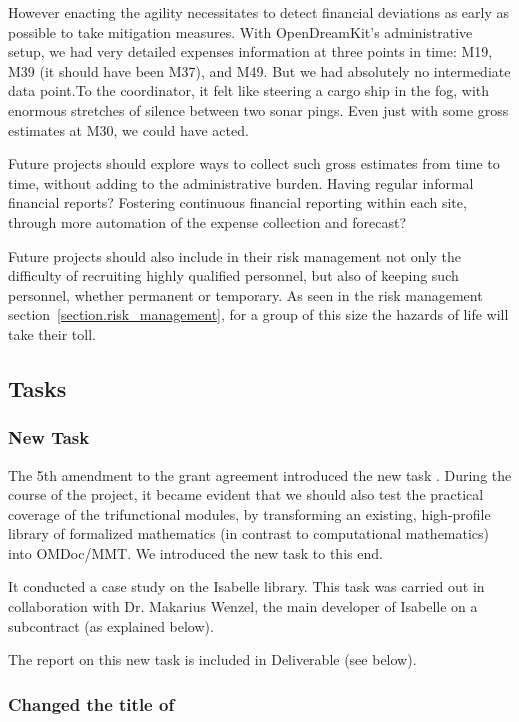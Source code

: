 However enacting the agility necessitates to detect financial
deviations as early as possible to take mitigation measures. With
OpenDreamKit's administrative setup, we had very detailed expenses
information at three points in time: M19, M39 (it should have been
M37), and M49. But we had absolutely no intermediate data point.To the  
coordinator, it felt like steering a cargo ship in the fog, with
enormous stretches of silence between two sonar pings. Even just with
some gross estimates at M30, we could have acted.

Future projects should explore ways to collect such gross estimates
from time to time, without adding to the administrative burden. Having
regular informal financial reports? Fostering continuous financial
reporting within each site, through more automation of the expense
collection and forecast?

Future projects should also include in their risk management not only
the difficulty of recruiting highly qualified personnel, but also of
keeping such personnel, whether permanent or temporary. As seen in the
risk management section~\ref{section.risk_management}, for a group of this size
the hazards of life will take their toll.

\subsection{Tasks}

\subsubsection{New Task }

The 5th amendment to the grant agreement introduced the new task .
During the course of the project, it became evident that we should also test the practical coverage of the trifunctional modules, by
transforming an existing, high-profile library of formalized mathematics (in contrast to computational mathematics) into OMDoc/MMT.
We introduced the new task to this end.

It conducted a case study on the Isabelle library.
This task was carried out in collaboration with Dr. Makarius Wenzel, the main developer of Isabelle on a subcontract (as explained below).

The report on this new task is included in Deliverable
 (see below).

\subsubsection{Changed the title of }


